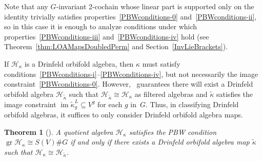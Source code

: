 \documentclass[pdftex]{sigma}
\numberwithin{equation}{section}
\newtheorem{Theorem}{Theorem}[section]
\DeclareMathOperator{\im}{im}
\DeclareMathOperator{\gr}{gr}
\begin{document}
Note that any $G$-invariant 2-cochain whose linear part is supported only on the identity
trivially satisfies properties~\eqref{PBWconditions-0}
and~\eqref{PBWconditions-ii}, so in this case it is enough to analyze
conditions under which properties~\eqref{PBWconditions-iii} and~\eqref{PBWconditions-iv} hold
(see Theorem~\ref{thm:LOAMapsDoubledPerm} and Section~\ref{InvLieBrackets}).

\begin{Remark}%
	If $\mathcal{H}_{\kappa}$ is a Drinfeld orbifold algebra, then $\kappa$ must satisfy conditions~\eqref{PBWconditions-i}--\eqref{PBWconditions-iv}, but not necessarily the image constraint~\eqref{PBWconditions-0}.
	However,~\cite[Theorem~7.2(ii)]{SWorbifold} guarantees there will exist a
	Drinfeld orbifold algebra $\mathcal{H}_{\widetilde{\kappa}}$ such that
	$\mathcal{H}_{\widetilde{\kappa}}\cong\mathcal{H}_{\kappa}$ as
	filtered algebras and $\widetilde{\kappa}$ satisfies the image constraint
	$\im \widetilde{\kappa}^L_g\subseteq V^g$ for each $g$ in~$G$.
	Thus, in classifying Drinfeld orbifold algebras, it suffices to only
	consider Drinfeld orbifold algebra maps.
\end{Remark}

\begin{Theorem}[{\cite[Theorems~3.1 and~7.2(ii)]{SWorbifold}}]
	A quotient algebra $\mathcal{H}_{\kappa}$ satisfies the PBW condition
	$\gr\mathcal{H}_{\kappa}\cong S(V)\# G$ if and only if there exists a
	Drinfeld orbifold algebra map $\widetilde{\kappa}$ such that $\mathcal{H_{\kappa}}\cong\mathcal{H_{\widetilde{\kappa}}}$.
\end{Theorem}
\end{document}
